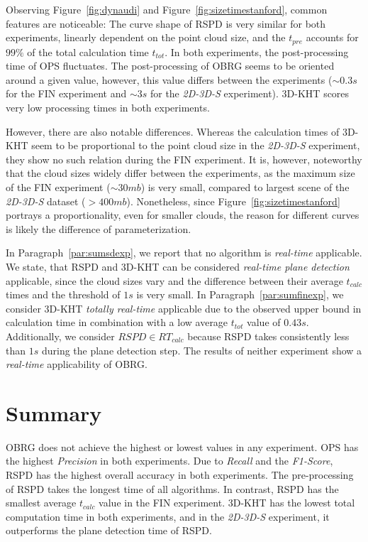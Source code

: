 \documentclass[main.tex]{subfiles}
\begin{document}
Observing Figure~\ref{fig:dynaudi} and Figure~\ref{fig:sizetimestanford}, common features are noticeable: 
The curve shape of RSPD is very similar for both experiments, linearly dependent on the point cloud size, and the
$t_{pre}$ accounts for $99\%$ of the total calculation time $t_{tot}$.
In both experiments, the post-processing time of OPS fluctuates.
The post-processing of OBRG seems to be oriented around a given value, however, this value differs
between the experiments (${\sim}0.3s$ for the FIN experiment and ${\sim}3s$ for the \textit{2D-3D-S} experiment).
3D-KHT scores very low processing times in both experiments.

However, there are also notable differences.
Whereas the calculation times of 3D-KHT seem to be proportional to the point cloud size in the \textit{2D-3D-S} experiment, they show no such
relation during the FIN experiment. It is, however, noteworthy that the cloud sizes widely differ between the experiments, as the
maximum size of the FIN experiment (${\sim}30mb$) is very small, compared to largest scene of the \textit{2D-3D-S} dataset (${>}400mb$).
Nonetheless, since Figure~\ref{fig:sizetimestanford} portrays a proportionality, even for smaller clouds, the reason for
different curves is likely the difference of parameterization.

In Paragraph~\ref{par:sumsdexp}, we report that no algorithm is \textit{real-time} applicable. We state, that
RSPD and 3D-KHT can be considered \textit{real-time plane detection} applicable, since the cloud sizes vary and
the difference between their average $t_{calc}$ times and the threshold of $1s$ is very small.
In Paragraph~\ref{par:sumfinexp}, we consider 3D-KHT \textit{totally real-time} applicable due to the observed
upper bound in calculation time in combination with a low average $t_{tot}$ value of $0.43s$. Additionally,
we consider $RSPD \in RT_{calc}$ because RSPD takes consistently less than $1s$ during the plane detection step.
The results of neither experiment show a \textit{real-time} applicability of OBRG.


\section{Summary}
OBRG does not achieve the highest or lowest values in any experiment.
OPS has the highest \textit{Precision} in both experiments.
Due to \textit{Recall} and the \textit{F1-Score}, RSPD has the highest overall accuracy in both experiments.
The pre-processing of RSPD takes the longest time of all algorithms. In contrast, RSPD has the smallest average $t_{calc}$
value in the FIN experiment. 3D-KHT has the lowest total computation time in both experiments, and in the \textit{2D-3D-S} experiment,
it outperforms the plane detection time of RSPD.
\end{document}
